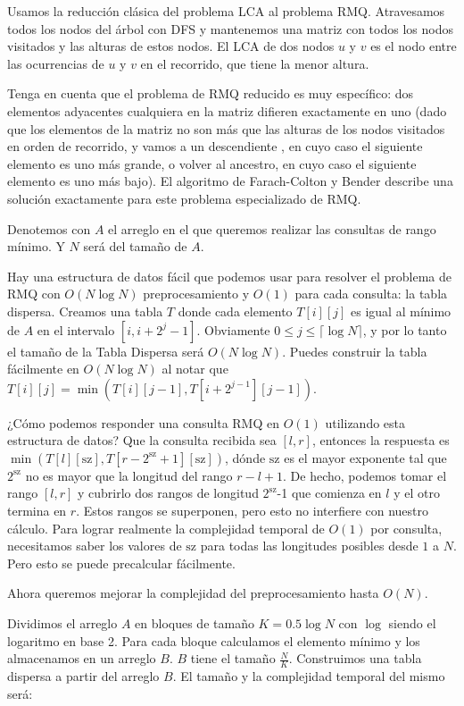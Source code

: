 Usamos la reducción clásica del problema LCA al problema RMQ. Atravesamos todos los nodos del árbol con DFS 
y mantenemos una matriz con todos los nodos visitados y las alturas de estos nodos. El LCA de dos nodos $u$ y $v$ es el nodo entre las ocurrencias de $u$ y $v$ en el recorrido, que tiene la menor altura.

Tenga en cuenta que el problema de RMQ reducido es muy específico: dos elementos adyacentes cualquiera en la matriz difieren exactamente en uno (dado que los elementos de la matriz no son más que las alturas de los nodos visitados en orden de recorrido, y vamos a un descendiente , en cuyo caso el siguiente elemento es uno más grande, o volver al ancestro, en cuyo caso el siguiente elemento es uno más bajo). El algoritmo de Farach-Colton y Bender describe una solución exactamente para este problema especializado de RMQ.

Denotemos con $A$ el arreglo en el que queremos realizar las consultas de rango mínimo. Y $N$ será del tamaño de $A$.

Hay una estructura de datos fácil que podemos usar para resolver el problema de RMQ con $O(N \log N)$ preprocesamiento y $O(1)$ para cada consulta: la tabla dispersa. Creamos una tabla $T$ donde cada elemento $T[i][j]$ es igual al mínimo de $A$ en el intervalo $[i, i + 2^j - 1]$. Obviamente $0 \leq j \leq \lceil 
\log N \rceil$, y por lo tanto el tamaño de la Tabla Dispersa será $O(N \log N)$. Puedes construir la 
tabla fácilmente en $O(N\log N)$ al notar que $T[i][j] = \min(T[i][j-1],T[i+2^{j-1}][j-1])$.

¿Cómo podemos responder una consulta RMQ en $O(1)$ utilizando esta estructura de datos? Que la consulta 
recibida sea $[l, r]$, entonces la respuesta es $\min(T[l][\text{sz}],T[r-2^{\text{sz}}+1][\text{sz}])$, 
dónde $\text{sz}$ es el mayor exponente tal que $2^{\text{sz}}$ no es mayor que la longitud del 
rango $r-l+1$. De hecho, podemos tomar el rango $[l, r]$ y cubrirlo dos rangos de longitud
$2^{\text{sz}}$-1 que comienza en $l$ y el otro termina en $r$. Estos rangos se superponen, 
pero esto no interfiere con nuestro cálculo. Para lograr realmente la complejidad temporal de $O(1)$ por 
consulta, necesitamos saber los valores de $\text{sz}$ para todas las longitudes posibles desde $1$ a 
$N$. Pero esto se puede precalcular fácilmente.

Ahora queremos mejorar la complejidad del preprocesamiento hasta $O(N)$.

Dividimos el arreglo $A$ en bloques de tamaño $K = 0.5 \log N$ con $\log$ siendo el logaritmo en base 2. Para cada bloque calculamos el elemento mínimo y los almacenamos en un arreglo $B$. $B$ tiene el tamaño $\frac{N}{K}$. Construimos una tabla dispersa a partir del arreglo $B$. El tamaño y la complejidad temporal del mismo será:

